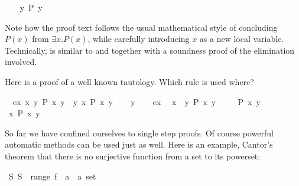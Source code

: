 \begin{isabellebody}
\isacommand{{\isachardot}{\isachardot}}\isanewline
\ \ \isamarkupfalse%
\ {\isachardoublequote}{\isasymexists}y{\isachardot}\ P\ y{\isachardoublequote}\ \isamarkupfalse%
\isacommand{{\isachardot}{\isachardot}}\isanewline
\isamarkupfalse%
%
\endisatagproof
{\isafoldproof}%
%
\isadelimproof
%
\endisadelimproof
\isamarkuptrue%
%
\begin{isamarkuptext}%
\noindent Note how the proof text follows the usual mathematical style
of concluding $P(x)$ from $\exists x. P(x)$, while carefully introducing $x$
as a new local variable.  Technically,  is similar to
 and  together with a soundness proof of
the elimination involved.

Here is a proof of a well known tautology.
Which rule is used where?%
\end{isamarkuptext}%
\isamarkupfalse%
\ \ ex{\isacharcolon}\ {\isachardoublequote}{\isasymexists}x{\isachardot}\ {\isasymforall}y{\isachardot}\ P\ x\ y{\isachardoublequote}\ \ {\isachardoublequote}{\isasymforall}y{\isachardot}\ {\isasymexists}x{\isachardot}\ P\ x\ y{\isachardoublequote}\isanewline
%
\isadelimproof
%
\endisadelimproof
%
\isatagproof
\isamarkupfalse%
\isanewline
\ \ \isamarkupfalse%
\ y\isanewline
\ \ \isamarkupfalse%
\ ex\ \isamarkupfalse%
\ x\ \ {\isachardoublequote}{\isasymforall}y{\isachardot}\ P\ x\ y{\isachardoublequote}\ \isamarkupfalse%
\isacommand{{\isachardot}{\isachardot}}\isanewline
\ \ \isamarkupfalse%
\ {\isachardoublequote}P\ x\ y{\isachardoublequote}\ \isamarkupfalse%
\isacommand{{\isachardot}{\isachardot}}\isanewline
\ \ \isamarkupfalse%
\ {\isachardoublequote}{\isasymexists}x{\isachardot}\ P\ x\ y{\isachardoublequote}\ \isamarkupfalse%
\isacommand{{\isachardot}{\isachardot}}\isanewline
\isamarkupfalse%
%
\endisatagproof
{\isafoldproof}%
%
\isadelimproof
%
\endisadelimproof
\isamarkuptrue%
%
\isamarkuptrue%
%
\begin{isamarkuptext}%
So far we have confined ourselves to single step proofs. Of course
powerful automatic methods can be used just as well. Here is an example,
Cantor's theorem that there is no surjective function from a set to its
powerset:%
\end{isamarkuptext}%
\isamarkupfalse%
\ {\isachardoublequote}{\isasymexists}S{\isachardot}\ S\ {\isasymnotin}\ range\ {\isacharparenleft}f\ {\isacharcolon}{\isacharcolon}\ {\isacharprime}a\ {\isasymRightarrow}\ {\isacharprime}a\ set{\isacharparenright}{\isachardoublequote}\isanewline

\end{isabellebody}
